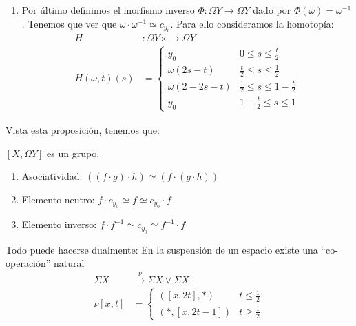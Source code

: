 \begin{demo}
\begin{enumerate}
\item Por último definimos el morfismo inverso $\varPhi : \Omega Y \longrightarrow \Omega Y $ dado por $\varPhi(\omega) = \omega^{-1}$. Tenemos que ver que $\omega \cdotp \omega^{-1} \simeq c_{y_0}$. Para ello consideramos la homotopía:
\begin{align*}
H &: \Omega Y \times \longrightarrow \Omega Y \\
H(\omega, t)(s) &= 
\begin{cases}
y_0 & 0 \leq s \leq \frac{t}{2} \\
\omega(2s - t) & \frac{t}{2} \leq s \leq \frac{1}{2} \\
\omega(2 - 2s - t) & \frac{1}{2} \leq s \leq 1 - \frac{t}{2} \\
y_0 & 1 - \frac{t}{2} \leq s \leq 1
\end{cases}
\end{align*}
\end{enumerate}
\end{demo}
Vista esta proposición, tenemos que:
\begin{teor}
$[X, \Omega Y]$ es un grupo.
\end{teor}
\begin{demo}
\begin{enumerate}
\item Asociatividad: $ \left((f \cdotp g) \cdotp h \right) \simeq \left(f \cdotp (g \cdotp h) \right)  $
\item Elemento neutro: $f \cdotp c_{y_0} \simeq f \simeq c_{y_0} \cdotp f$
\item Elemento inverso: $ f \cdotp f^{-1} \simeq c_{y_0} \simeq f^{-1} \cdotp f$
\end{enumerate}
\end{demo}
Todo puede hacerse dualmente: En la suspensión de un espacio existe una ``co-operación'' natural
\begin{align*}
\Sigma X &\stackrel{\nu}{\longrightarrow} \Sigma X \vee \Sigma X \\
\nu [x, t] &= 
\begin{cases}
([x, 2t], \ast ) & t \leq \frac{1}{2} \\
( \ast, [x, 2t -1]) & t \geq \frac{1}{2}
\end{cases}
\end{align*}

